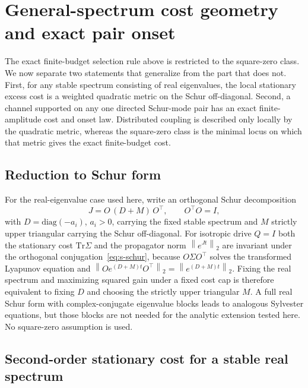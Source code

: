 \documentclass[
  aps,prl,preprint,notitlepage,superscriptaddress,nofootinbib,longbibliography,
  amsmath,amssymb
]{revtex4-2}
\newcommand{\Tr}{\mathrm{Tr}}
\newcommand{\opnorm}[1]{\left\lVert #1\right\rVert_2}
\begin{document}
\section{General-spectrum cost geometry and exact pair onset}
\label{sec:s-general}

The exact finite-budget selection rule above is restricted to the square-zero
class.  We now separate two statements that generalize from the part that does
not.  First, for any stable spectrum consisting of real eigenvalues, the local
stationary excess cost is a weighted quadratic metric on the Schur
off-diagonal.  Second, a channel supported on any one directed Schur-mode pair
has an exact finite-amplitude cost and onset law.  Distributed coupling is
described only locally by the quadratic metric, whereas the square-zero class
is the minimal locus on which that metric gives the exact finite-budget cost.

\subsection{Reduction to Schur form}
\label{sec:s-schur}

For the real-eigenvalue case used here, write an orthogonal Schur decomposition
\begin{equation}
J=O\,(D+M)\,O^\top,\qquad O^\top O=I,
\label{eq:s-schur}
\end{equation}
with $D=\mathrm{diag}(-a_i)$, $a_i>0$, carrying the fixed stable spectrum and
$M$ strictly upper triangular carrying the Schur off-diagonal. For isotropic
drive $Q=I$ both the stationary cost $\Tr\Sigma$ and the propagator norm
$\opnorm{e^{Jt}}$ are invariant under the orthogonal
conjugation~\eqref{eq:s-schur}, because $O\Sigma O^\top$ solves the transformed
Lyapunov equation and $\opnorm{Oe^{(D+M)t}O^\top}=\opnorm{e^{(D+M)t}}$. Fixing
the real spectrum and maximizing squared gain under a fixed cost cap is therefore equivalent to
fixing $D$ and choosing the strictly upper triangular $M$. A full real Schur form
with complex-conjugate eigenvalue blocks leads to analogous Sylvester equations,
but those blocks are not needed for the analytic extension tested here. No
square-zero assumption is used.

\subsection{Second-order stationary cost for a stable real spectrum}
\label{sec:s-gencost}
\end{document}
